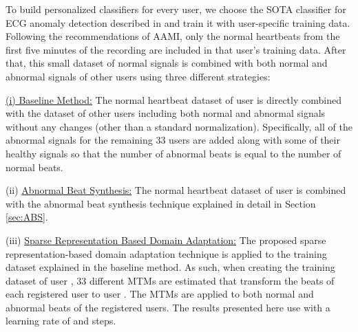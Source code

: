 \documentclass[journal,transmag]{IEEEtran}
\begin{document}
\begin{table*}[!htbp]
{{\begin{tabular}{lccccc}
    \hline
    \end{tabular}}
    }
    \caption{Comparison of ABS \cite{kiranyaz2017personalized}, NPE-based (ours), Baseline (ours), Domain Adaptation (ours), Ensemble Classification (ours), and Energy-efficient Classification (ours) methods. The classification performance of former studies, including global and one-shot classifiers, are presented. The results show that our personalized zero-shot ensemble classifier surpasses in F1-Score all the other methods, and is on-par with \cite{shaker2020generalization}, even though \cite{shaker2020generalization} is a global one-shot GAN-based classifier with a signal size of 300 (as opposed to 128). The confidence threshold for the ensemble classifier is chosen using the validation set. The average ensemble classifier results show the average over all possible confidence thresholds. \\
     Personalized classifiers. \\
    * Zero-shot classifiers. }
    \label{tab:comparison_others}
\end{table*}

To build personalized classifiers for every user, we choose the SOTA classifier for ECG anomaly detection described in \cite{kiranyaz2017personalized} and train it with user-specific training data. Following the recommendations of AAMI, only the normal heartbeats from the first five minutes of the recording are included in that user's training data. After that, this small dataset of normal signals is combined with both normal and abnormal signals of other users using three different strategies: 

\underline{(i) Baseline Method:} The normal heartbeat dataset of user  is directly combined with the dataset of other users including both normal and abnormal signals without any changes (other than a standard normalization). Specifically, all of the abnormal signals for the remaining 33 users are added along with some of their healthy signals so that the number of abnormal beats is equal to the number of normal beats.

(ii) \underline{Abnormal Beat Synthesis:} The normal heartbeat dataset of user  is combined with the abnormal beat synthesis technique explained in detail in Section \ref{sec:ABS}.

(iii) \underline{Sparse Representation Based Domain Adaptation:} The proposed sparse representation-based domain adaptation technique is applied to the training dataset explained in the baseline method. As such, when creating the training dataset of user , 33 different MTMs are estimated that transform the beats of each registered user  to user . The MTMs are applied to both normal and abnormal beats of the registered users. The results presented here use  with a learning rate of  and  steps.
\end{document}
